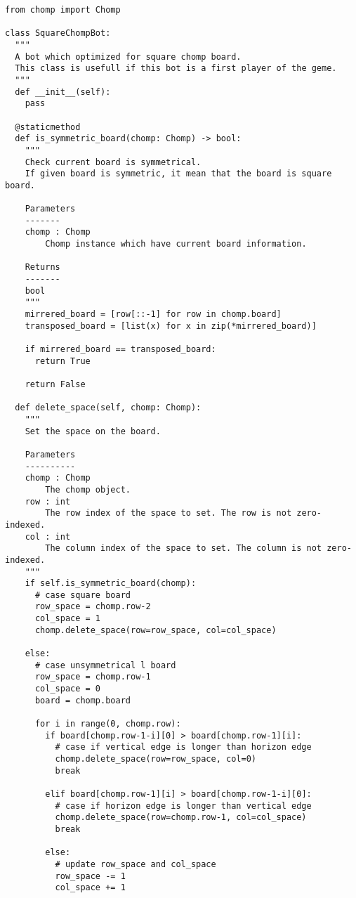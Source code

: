\documentclass[uplatex,dvipdfmx,a4paper,10pt]{jsarticle}
\theoremstyle{definition}
\begin{document}
\begin{lstlisting}[caption={\(n \times n\)盤面で必ず勝つbotのクラス}, label=n_times_n_chomp_bot]
from chomp import Chomp 

class SquareChompBot:
  """
  A bot which optimized for square chomp board.
  This class is usefull if this bot is a first player of the geme.
  """
  def __init__(self):
    pass

  @staticmethod
  def is_symmetric_board(chomp: Chomp) -> bool:
    """
    Check current board is symmetrical.
    If given board is symmetric, it mean that the board is square board.

    Parameters
    -------
    chomp : Chomp
        Chomp instance which have current board information.

    Returns
    -------
    bool
    """
    mirrered_board = [row[::-1] for row in chomp.board]
    transposed_board = [list(x) for x in zip(*mirrered_board)]

    if mirrered_board == transposed_board:
      return True
    
    return False

  def delete_space(self, chomp: Chomp):
    """
    Set the space on the board.
    
    Parameters
    ----------
    chomp : Chomp
        The chomp object.
    row : int
        The row index of the space to set. The row is not zero-indexed.
    col : int
        The column index of the space to set. The column is not zero-indexed.
    """
    if self.is_symmetric_board(chomp):
      # case square board
      row_space = chomp.row-2
      col_space = 1
      chomp.delete_space(row=row_space, col=col_space)

    else:
      # case unsymmetrical l board
      row_space = chomp.row-1
      col_space = 0
      board = chomp.board

      for i in range(0, chomp.row):
        if board[chomp.row-1-i][0] > board[chomp.row-1][i]:
          # case if vertical edge is longer than horizon edge
          chomp.delete_space(row=row_space, col=0)
          break

        elif board[chomp.row-1][i] > board[chomp.row-1-i][0]: 
          # case if horizon edge is longer than vertical edge
          chomp.delete_space(row=chomp.row-1, col=col_space)
          break

        else:
          # update row_space and col_space
          row_space -= 1
          col_space += 1
    
\end{lstlisting}
\end{document}
